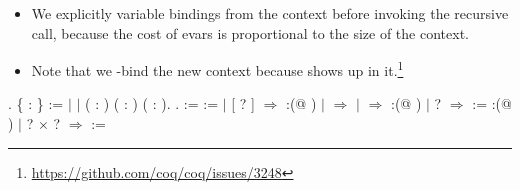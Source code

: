 \begin{itemize}
\item  We explicitly  variable bindings from the context before
      invoking the recursive call, because the cost of evars is
      proportional to the size of the context.



\item  Note that we -bind the new context because  shows up
      in it.\footnote{\url{https://github.com/coq/coq/issues/3248}} 
\end{itemize}
\begin{coqdoccode}
\coqdocemptyline
\coqdocnoindent
{} .\coqdoceol
\coqdocindent{1.00em}
  \{ : \} :=\coqdoceol
\coqdocindent{1.00em}
\ensuremath{|} \coqdoceol
\coqdocindent{1.00em}
\ensuremath{|}  ( : ) ( : ) ( : ).\coqdoceol
\coqdocnoindent
{} .\coqdoceol
\coqdocemptyline
\coqdocnoindent
{}     :=\coqdoceol
\coqdocindent{1.00em}
   :=     \coqdoceol
\coqdocindent{1.00em}
  \coqdoceol
\coqdocindent{1.00em}
\ensuremath{|} [  ? \coqdocvar{\_}]\coqdoceol
\coqdocindent{2.00em}
\ensuremath{\Rightarrow} :(@  )\coqdoceol
\coqdocindent{1.00em}
\ensuremath{|} \coqdocvar{\_}\coqdoceol
\coqdocindent{2.00em}
\ensuremath{\Rightarrow}\coqdoceol
\coqdocindent{2.00em}
  \coqdoceol
\coqdocindent{2.00em}
\ensuremath{|}  \ensuremath{\Rightarrow} :(@ )\coqdoceol
\coqdocindent{2.00em}
\ensuremath{|}  ?\coqdoceol
\coqdocindent{3.00em}
\ensuremath{\Rightarrow}   :=   \coqdoceol
\coqdocindent{4.50em}
:(@  )\coqdoceol
\coqdocindent{2.00em}
\ensuremath{|} ? \ensuremath{\times} ?\coqdoceol
\coqdocindent{3.00em}
\ensuremath{\Rightarrow}   :=   \coqdoceol

\end{coqdoccode}

